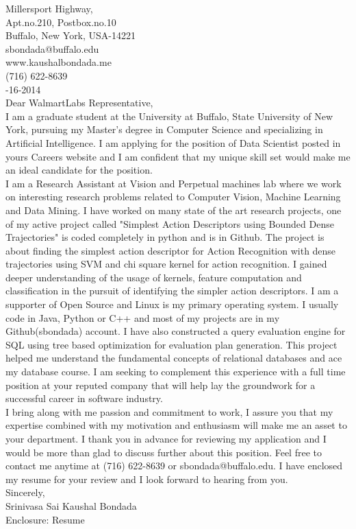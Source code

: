 \documentclass[10pt,letterpaper,oneside]{article}
\begin{document}
 Millersport Highway,\\
Apt.no.210, Postbox.no.10\\
Buffalo, New York, USA-14221\\
sbondada@buffalo.edu\\
www.kaushalbondada.me\\
(716) 622-8639\\

-16-2014\\
 
\noindent Dear WalmartLabs Representative,\\
 
I am a graduate student at the University at Buffalo, State University of New York, pursuing my Master's degree in Computer Science and
specializing in Artificial Intelligence. I am applying for the position of Data Scientist posted in yours Careers website and I am confident
that my unique skill set would make me an ideal candidate for the position.\\

I am a Research Assistant at Vision and Perpetual machines lab where we work on interesting research problems related to Computer
Vision, Machine Learning and Data Mining. I have worked on many state of the art research projects, one of my active project called "Simplest Action
Descriptors using Bounded Dense Trajectories" is coded completely in python and is in Github. The project is about finding the simplest action descriptor
for Action Recognition with dense trajectories using SVM and chi square kernel for action recognition. I gained deeper understanding of the
usage of kernels, feature computation and classification in the pursuit of identifying the simpler action descriptors. I am a supporter of Open Source and Linux is my primary operating system. I usually code in Java, Python or C++ and most of my projects are in my Github(sbondada) account. 
I have also constructed a query evaluation engine for SQL using tree based optimization for evaluation plan generation. This project helped me understand the fundamental concepts
of relational databases and ace my database course. I am seeking to complement this experience with a full time position at your reputed company that will help lay the 
groundwork for a successful career in software industry.\\

I bring along with me passion and commitment to work, I assure you that my expertise combined with my motivation and enthusiasm will make me an asset to your department. I thank you in advance for reviewing my application and I would be more than glad to discuss further about this position. Feel free to contact me anytime at (716) 622-8639 or sbondada@buffalo.edu. I have enclosed my resume for your review and I look forward to hearing from you.\\
 
\noindent Sincerely,\\
Srinivasa Sai Kaushal Bondada\\
Enclosure: Resume\\
\end{document}
